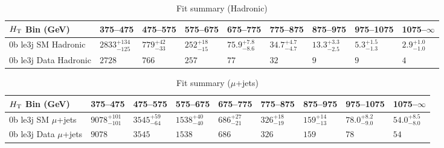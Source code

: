 \documentclass[8pt]{article}
\def\scalht{\mbox{$H_{\rm{T}}$}\xspace}
\newcommand\T{\rule{0pt}{2.6ex}}
\begin{document}
\begin{table}[ht!]
\caption{Fit summary (Hadronic)}
\label{tab:ensemble-summary}
\centering
\begin{tabular}{ lllllllll }

\hline
\scalht Bin (GeV)       & 375--475                       & 475--575                       & 575--675                       & 675--775                       & 775--875                       & 875--975                       & 975--1075                      & 1075--$\infty$                 \\ [1.000000ex]
\hline
0b le3j SM Hadronic\T   & $2833^{+134}_{-125}$           & $779^{+42}_{-33}$              & $252^{+18}_{-15}$              & $75.9^{+7.8}_{-8.6}$           & $34.7^{+4.7}_{-4.7}$           & $13.3^{+3.3}_{-2.5}$           & $5.3^{+1.5}_{-1.3}$            & $2.9^{+1.0}_{-1.0}$            \\ 
0b le3j Data Hadronic\T & $2728$                         & $766$                          & $257$                          & $77$                           & $32$                           & $9$                            & $9$                            & $4$                            \\ 
\hline

\end{tabular}
\end{table}
\begin{table}[ht!]
\caption{Fit summary ($\mu$+jets)}
\label{tab:ensemble-summary}
\centering
\begin{tabular}{ lllllllll }

\hline
\scalht Bin (GeV)       & 375--475                       & 475--575                       & 575--675                       & 675--775                       & 775--875                       & 875--975                       & 975--1075                      & 1075--$\infty$                 \\ [1.000000ex]
\hline
0b le3j SM $\mu$+jets\T & $9078^{+101}_{-101}$           & $3545^{+59}_{-64}$             & $1538^{+40}_{-40}$             & $686^{+27}_{-21}$              & $326^{+18}_{-19}$              & $159^{+14}_{-13}$              & $78.0^{+8.2}_{-9.0}$           & $54.0^{+8.5}_{-8.0}$           \\ 
0b le3j Data $\mu$+jets\T & $9078$                         & $3545$                         & $1538$                         & $686$                          & $326$                          & $159$                          & $78$                           & $54$                           \\ 
\hline

\end{tabular}
\end{table}
\end{document}
